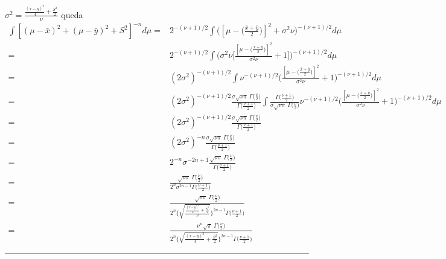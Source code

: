 \documentclass[12pt,]{article}
\begin{document}
\(\sigma^2=\frac{\frac{(\bar{x}-\bar{y})^2}{4}+\frac{S^2}{2}}{\nu}\)
queda \[
\begin{array}{rl}
\displaystyle \int[(\mu-\bar{x})^2+(\mu-\bar{y})^2+S^2]^{-n}d\mu=&2^{-(\nu+1)/2}\displaystyle \int\bigg( [\mu- \big(\frac{\bar{x}+\bar{y}}{2}\big)]^2+\sigma^2\nu\bigg)^{-(\nu+1)/2}d\mu\\
=&2^{-(\nu+1)/2}\displaystyle \int\bigg( \sigma^2\nu\bigg[ \frac{[\mu- \big(\frac{\bar{x}+\bar{y}}{2}\big)]^2}{\sigma^2\nu}+1\bigg]\bigg)^{-(\nu+1)/2}d\mu\\
=&(2\sigma^2)^{-(\nu+1)/2}\displaystyle \int\nu^{-(\nu+1)/2}\bigg( \frac{[\mu- \big(\frac{\bar{x}+\bar{y}}{2}\big)]^2}{\sigma^2\nu}+1\bigg)^{-(\nu+1)/2}d\mu\\
=&(2\sigma^2)^{-(\nu+1)/2}\frac{\sigma\sqrt{\nu\pi}\ \Gamma\big(\frac{\nu}{2}\big)}{\Gamma\bigg(\frac{\nu+1}{2}\bigg)} \displaystyle \int \frac{\Gamma\bigg(\frac{\nu+1}{2}\bigg)}{\sigma\sqrt{\nu\pi}\ \Gamma\big(\frac{\nu}{2}\big)}\nu^{-(\nu+1)/2}\bigg( \frac{[\mu- \big(\frac{\bar{x}+\bar{y}}{2}\big)]^2}{\sigma^2\nu}+1\bigg)^{-(\nu+1)/2}d\mu\\
=&(2\sigma^2)^{-(\nu+1)/2}\frac{\sigma\sqrt{\nu\pi}\ \Gamma\big(\frac{\nu}{2}\big)}{\Gamma\bigg(\frac{\nu+1}{2}\bigg)} \\
=&(2\sigma^2)^{-n}\frac{\sigma\sqrt{\nu\pi}\ \Gamma\big(\frac{\nu}{2}\big)}{\Gamma\bigg(\frac{\nu+1}{2}\bigg)} \\
=&2^{-n}\sigma^{-2n+1}\frac{\sqrt{\nu\pi}\ \Gamma\big(\frac{\nu}{2}\big)}{\Gamma\bigg(\frac{\nu+1}{2}\bigg)} \\
=&\displaystyle\frac{\sqrt{\nu\pi}\ \Gamma\big(\frac{\nu}{2}\big)}{2^{n}\sigma^{2n-1}\Gamma\bigg(\frac{\nu+1}{2}\bigg)} \\
=&\displaystyle\frac{\sqrt{\nu\pi}\ \Gamma\big(\frac{\nu}{2}\big)}{2^{n}\Bigg\{\sqrt{\frac{\frac{(\bar{x}-\bar{y})^2}{4}+\frac{S^2}{2}}{\nu}}   \Bigg\}^{2n-1}\Gamma\bigg(\frac{\nu+1}{2}\bigg)} \\
=&\displaystyle \frac{\nu^n \sqrt{\pi}\ \Gamma\big(\frac{\nu}{2}\big)}{2^{n}\Bigg\{\sqrt{\frac{(\bar{x}-\bar{y})^2}{4}+\frac{S^2}{2}}   \Bigg\}^{2n-1}\Gamma\bigg(\frac{\nu+1}{2}\bigg)} 
\end{array}
\]

\begin{center}\rule{0.5\linewidth}{\linethickness}\end{center}
\end{document}
